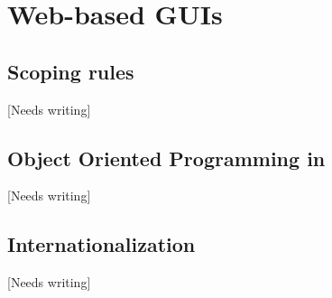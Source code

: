 \documentclass[showtrims]{memoir}
\begin{document}
% 

% 

\label{chap:tcltk}



\chapter{Web-based GUIs}
\label{chap:WebGUIS}



\backmatter
\appendix

\section{Scoping rules}
\label{sec:scoping-rules}
[Needs writing]

\section{Object Oriented Programming in \R{}}
\label{sec:object-orient-progr}
[Needs writing]

\section{Internationalization}
\label{sec:internationalization}
[Needs writing]


\end{document}
